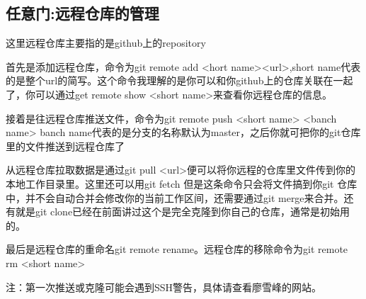 \documentclass[12pt,a4paper]{article}
\begin{document}
		\subsection{任意门:远程仓库的管理}
		这里远程仓库主要指的是github上的repository
		
		首先是添加远程仓库，命令为git remote add <hort name><url>,short name代表的是整个url的简写。这个命令我理解的是你可以和你github上的仓库关联在一起了，你可以通过get remote show <short name>来查看你远程仓库的信息。
		
		接着是往远程仓库推送文件，命令为git remote push <short name> <banch name> banch name代表的是分支的名称默认为master，之后你就可把你的git仓库里的文件推送到远程仓库了
		
		从远程仓库拉取数据是通过git pull <url>便可以将你远程的仓库里文件传到你的本地工作目录里。这里还可以用git fetch 但是这条命令只会将文件搞到你git 仓库中，并不会自动合并会修改你的当前工作区间，还需要通过git merge来合并。还有就是git clone已经在前面讲过这个是完全克隆到你自己的仓库，通常是初始用的。
		
		最后是远程仓库的重命名git remote rename。远程仓库的移除命令为git remote rm  <short name>
		
		注：第一次推送或克隆可能会遇到SSH警告，具体请查看廖雪峰的网站。
		
		
\end{document}
